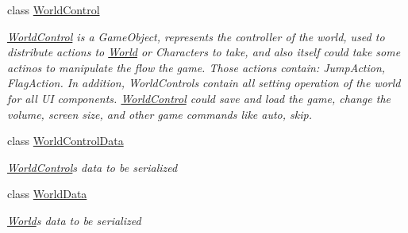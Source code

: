 \begin{DoxyCompactItemize}
class \hyperlink{classdoki_unity_1_1_world_control}{World\+Control}
\begin{DoxyCompactList}\small\item\em \hyperlink{classdoki_unity_1_1_world_control}{World\+Control} is a Game\+Object, represents the controller of the world, used to distribute actions to \hyperlink{classdoki_unity_1_1_world}{World} or Characters to take, and also itself could take some actinos to manipulate the flow the game. Those actions contain\+: Jump\+Action, Flag\+Action. In addition, World\+Controls contain all setting operation of the world for all UI components. \hyperlink{classdoki_unity_1_1_world_control}{World\+Control} could save and load the game, change the volume, screen size, and other game commands like auto, skip. \end{DoxyCompactList}\item 
class \hyperlink{classdoki_unity_1_1_world_control_data}{World\+Control\+Data}
\begin{DoxyCompactList}\small\item\em \hyperlink{classdoki_unity_1_1_world_control}{World\+Control}\textquotesingle{}s data to be serialized \end{DoxyCompactList}\item 
class \hyperlink{classdoki_unity_1_1_world_data}{World\+Data}
\begin{DoxyCompactList}\small\item\em \hyperlink{classdoki_unity_1_1_world}{World}\textquotesingle{}s data to be serialized \end{DoxyCompactList}\end{DoxyCompactItemize}
